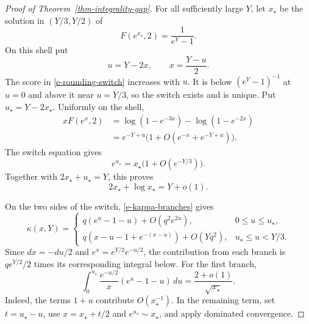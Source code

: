 \begin{proof}[Proof of Theorem~\ref{thm-integrality-gap}]
For all sufficiently large \(Y\), let \(x_\star\) be the solution in
\((Y/3,Y/2)\) of
\begin{equation}
\label{e-rounding-switch}
    F(e^{x_\star},2)=\frac1{e^Y-1}.
\end{equation}
On this shell put
\[
    u=Y-2x,
    \qquad
    x=\frac{Y-u}{2}.
\]
The score in \eqref{e-rounding-switch} increases with \(u\). It is below
\((e^Y-1)^{-1}\) at \(u=0\) and above it near \(u=Y/3\), so the switch
exists and is unique. Put \(u_\star=Y-2x_\star\). Uniformly on the shell,
\[
\begin{aligned}
    xF(e^x,2)
    &=
    \log(1-e^{-3x})-\log(1-e^{-2x})\\
    &=
    e^{-Y+u}
    \bigl(1+O(e^{-x}+e^{-Y+u})\bigr).
\end{aligned}
\]
The switch equation gives
\[
    e^{u_\star}
    =
    x_\star\bigl(1+O(e^{-Y/3})\bigr).
\]
Together with \(2x_\star+u_\star=Y\), this proves
\[
    2x_\star+\log x_\star=Y+o(1).
\]

On the two sides of the switch, \eqref{e-kappa-branches} gives
\[
    \kappa(x,Y)
    =
    \begin{cases}
    q(e^u-1-u)+O(q^2e^{2u}),
        &0\leq u\leq u_\star,\\[1mm]
    q(x-u-1+e^{-(x-u)})+O(Yq^2),
        &u_\star\leq u<Y/3.
\end{cases}
\]
Since \(dx=-du/2\) and \(e^x=e^{Y/2}e^{-u/2}\), the contribution from
each branch is \(qe^{Y/2}/2\) times its corresponding integral below.
For the first branch,
\[
    \int_0^{u_\star}
    \frac{e^{-u/2}}x(e^u-1-u)\,du
    =
    \frac{2+o(1)}{\sqrt{x_\star}}.
\]
Indeed, the terms \(1+u\) contribute \(O(x_\star^{-1})\). In the
remaining term, set \(t=u_\star-u\), use
\(x=x_\star+t/2\) and \(e^{u_\star}\sim x_\star\), and apply dominated
convergence.


\end{proof}
